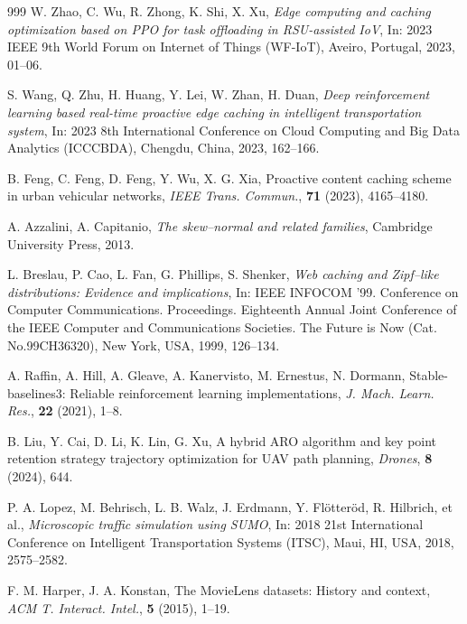 \documentclass{aims}
\numberwithin{equation}{section}
\begin{document}
\begin{thebibliography}{999}
 W. Zhao, C. Wu, R. Zhong, K. Shi, X. Xu,  \emph{Edge computing and caching optimization based on PPO for task offloading in RSU-assisted IoV},  In: 2023 IEEE 9th World Forum on Internet of Things (WF-IoT), Aveiro, Portugal, 2023, 01--06. 

 S. Wang, Q. Zhu, H. Huang, Y. Lei, W. Zhan, H. Duan,  \emph{Deep reinforcement learning based real-time proactive edge caching in intelligent transportation system},  In: 2023 8th International Conference on Cloud Computing and Big Data Analytics (ICCCBDA), Chengdu, China, 2023,  162--166. 

 B. Feng, C. Feng, D. Feng, Y. Wu, X. G. Xia,  Proactive content caching scheme in urban vehicular networks,  \emph{IEEE Trans. Commun.}, \textbf{71} (2023), 4165--4180. 

 A. Azzalini, A. Capitanio,  \emph{The skew--normal and related families}, Cambridge University Press, 2013.

 L. Breslau, P. Cao, L. Fan, G. Phillips, S. Shenker,  \emph{Web caching and Zipf--like distributions: Evidence and implications},  In: IEEE INFOCOM '99. Conference on Computer Communications. Proceedings. Eighteenth Annual Joint Conference of the IEEE Computer and Communications Societies. The Future is Now (Cat. No.99CH36320), New York, USA, 1999, 126--134. 

 A. Raffin, A. Hill, A. Gleave, A. Kanervisto, M. Ernestus, N. Dormann, Stable-baselines3: Reliable reinforcement learning implementations, \emph{J. Mach. Learn. Res.}, \textbf{22} (2021), 1--8. %

 B. Liu, Y. Cai, D. Li, K. Lin, G. Xu, A hybrid ARO algorithm and key point retention strategy trajectory optimization for UAV path planning, \emph{Drones},  \textbf{8} (2024), 644. 

 P. A. Lopez, M. Behrisch, L. B. Walz, J. Erdmann, Y. Fl{\"o}tter{\"o}d, R. Hilbrich,  et al., \emph{Microscopic traffic simulation using SUMO}, In: 2018 21st International Conference on Intelligent Transportation Systems (ITSC), Maui, HI, USA, 2018, 2575--2582. 

 F. M. Harper,   J. A. Konstan,  The MovieLens datasets: History and context,  \emph{ACM T. Interact. Intel.}, \textbf{5} (2015), 1--19. 
\end{thebibliography}
\end{document}
